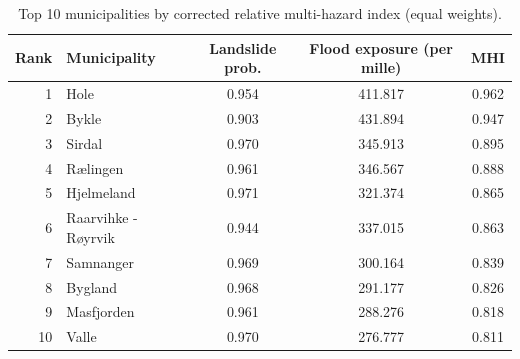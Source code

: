 \begin{table}[t]
\centering
\caption{Top 10 municipalities by corrected relative multi-hazard index (equal weights).}
\label{tab:top_mhi}
\scriptsize
\begin{tabular}{r l c c c}
\toprule
Rank & Municipality & Landslide prob. & Flood exposure (per mille) & MHI \\
\midrule
1 & Hole & 0.954 & 411.817 & 0.962 \\
2 & Bykle & 0.903 & 431.894 & 0.947 \\
3 & Sirdal & 0.970 & 345.913 & 0.895 \\
4 & R{\ae}lingen & 0.961 & 346.567 & 0.888 \\
5 & Hjelmeland & 0.971 & 321.374 & 0.865 \\
6 & Raarvihke - R{\o}yrvik & 0.944 & 337.015 & 0.863 \\
7 & Samnanger & 0.969 & 300.164 & 0.839 \\
8 & Bygland & 0.968 & 291.177 & 0.826 \\
9 & Masfjorden & 0.961 & 288.276 & 0.818 \\
10 & Valle & 0.970 & 276.777 & 0.811 \\
\bottomrule
\end{tabular}
\end{table}
